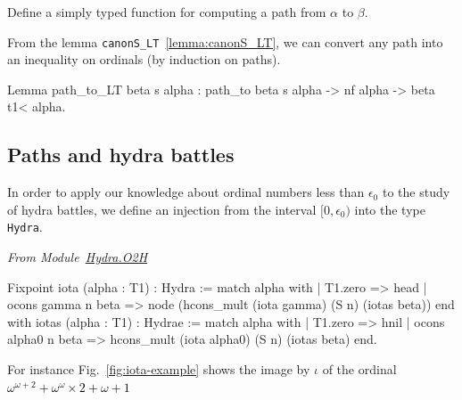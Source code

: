 \documentclass[a4paper]{book}
\begin{document}

\begin{exercise}
Define a simply typed function for computing a path from $\alpha$ to $\beta$.
\end{exercise}


\noindent 
From the lemma \texttt{canonS\_LT}~\vref{lemma:canonS_LT}, we can convert any path into an inequality on ordinals (by induction on paths).


\begin{Coqsrc}
Lemma path_to_LT beta s alpha :
  path_to beta s alpha -> nf alpha -> beta t1< alpha.
\end{Coqsrc}

\subsection{Paths and hydra battles}
\label{KS-o2h}

In order to apply our knowledge about  ordinal numbers less than $\epsilon_0$ to the study of hydra battles, we define an injection
from the interval $[0,\epsilon_0)$ into the type \texttt{Hydra}.

\vspace{4pt}

\emph{From Module~\href{../src/html/hydras.Hydra.O2H.html}{Hydra.O2H}}


\begin{Coqsrc}
Fixpoint iota (alpha : T1) : Hydra :=
  match alpha with
  | T1.zero => head
  | ocons gamma n beta => 
         node (hcons_mult (iota gamma) (S n) (iotas beta))
  end 
with iotas (alpha : T1) :  Hydrae :=
       match alpha with
       | T1.zero => hnil
       | ocons alpha0 n beta  => 
           hcons_mult (iota alpha0) (S n) (iotas beta)
       end.
\end{Coqsrc}  




For instance Fig.~\ref{fig:iota-example} shows the image by $\iota$ of the ordinal  \textcolor{black}{$\omega^{\omega+2}+\omega^\omega \times 2 + \omega + 1$}
\end{document}
